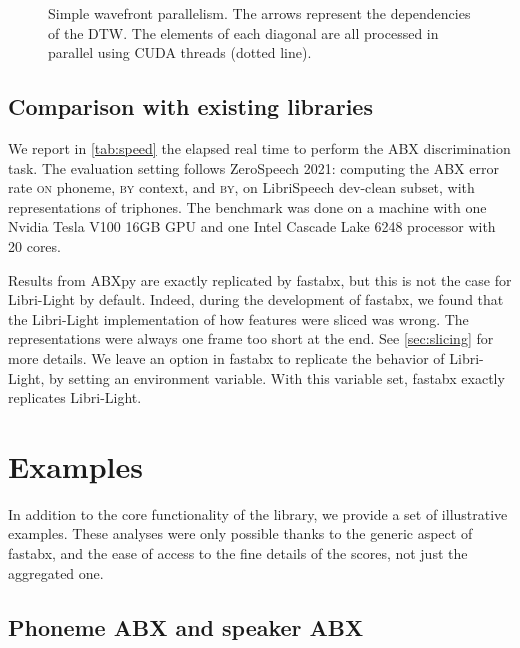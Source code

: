 \documentclass[11pt]{article}
\newcommand{\on}{\textsc{on}\xspace}
\newcommand{\by}{\textsc{by}\xspace}
\begin{document}
\begin{figure}
    \centering
    
    \caption{Simple wavefront parallelism. The arrows represent the dependencies of the DTW. The elements of each diagonal are all processed in parallel using CUDA threads (dotted line).}
    \label{fig:wavefront}
\end{figure}

\subsection{Comparison with existing libraries}

\begin{table}[ht]
\centering

\caption{Comparison between the three libraries. The speed is measured by the wall time to perform the ABX task on LibriSpeech dev-clean \by speaker, without subsampling.}
\label{tab:speed}
\end{table}

We report in \cref{tab:speed} the elapsed real time to perform the ABX discrimination task. The evaluation setting follows ZeroSpeech 2021: computing the ABX error rate \on phoneme, \by context, and \by, on LibriSpeech \citep{panayotov2015librispeech} dev-clean subset, with representations of triphones. The benchmark was done on a machine with one Nvidia Tesla V100 16GB GPU and one Intel Cascade Lake 6248 processor with 20 cores.

Results from ABXpy are exactly replicated by fastabx, but this is not the case for Libri-Light by default. Indeed, during the development of fastabx, we found that the Libri-Light implementation of how features were sliced was wrong. The representations were always one frame too short at the end. See \cref{sec:slicing} for more details. We leave an option in fastabx to replicate the behavior of Libri-Light, by setting an environment variable. With this variable set, fastabx exactly replicates Libri-Light.

\section{Examples}
In addition to the core functionality of the library, we provide a set of illustrative examples. These analyses were only possible thanks to the generic aspect of fastabx, and the ease of access to the fine details of the scores, not just the aggregated one.

\subsection{Phoneme ABX and speaker ABX}
\end{document}
